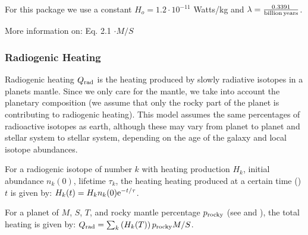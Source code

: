 \documentclass[letterpaper,10pt,english]{sphinxmanual}
\begin{document}
\sphinxAtStartPar
For this package we use a constant \(H_o = 1.2 \cdot 10^{-11}\) Watts/kg and
\(\lambda = \frac{0.3391}{\rm billion\,years}\).

\sphinxAtStartPar
More information on:
 Eq. 2.1 \(\cdot M / S\)


\subsubsection{Radiogenic Heating}
\label{\detokenize{quantities/surface/internal_heating/radiogenic_heating:radiogenic-heating}}\label{\detokenize{quantities/surface/internal_heating/radiogenic_heating::doc}}\label{\detokenize{quantities/surface/internal_heating/radiogenic_heating:id1}}
\sphinxAtStartPar
Radiogenic heating \(Q_{\rm rad}\) is the heating produced by slowly radiative isotopes in a planets mantle.
Since we only care for the mantle, we take into account the planetary composition
(we assume that only the rocky part of the planet is contributing to radiogenic heating).
This model assumes the same percentages of radioactive isotopes as earth, although these may vary
from planet to planet and stellar system to stellar system, depending on the age of the galaxy
and local isotope abundances.

\sphinxAtStartPar
For a radiogenic isotope of number \(k\) with heating production \(H_k\), initial abundance \(n_k (0)\),
lifetime \(\tau_k\), the heating heating produced at a certain time ({\hyperref[\detokenize{quantities/life/age:id1}]{}}) \(t\)
is given by: \(H_k(t) = H_k n_k (0) {\rm e}^{- t / \tau}\).

\sphinxAtStartPar
For a planet of {\hyperref[\detokenize{quantities/material/mass:id1}]{}} \(M\), {\hyperref[\detokenize{quantities/geometric/surface_area:id1}]{}} \(S\),
{\hyperref[\detokenize{quantities/life/age:id1}]{}} \(T\), and rocky mantle percentage \(p_{\rm rocky}\) (see {\hyperref[\detokenize{quantities/material/chemical_composition:id1}]{}}
and {\hyperref[\detokenize{quantities/material/composition_type:id1}]{}}), the total heating is given by:
\(Q_{\rm rad} = \sum_k \left(H_k(T)\right) p_{\rm rocky} M / S\).
\end{document}
